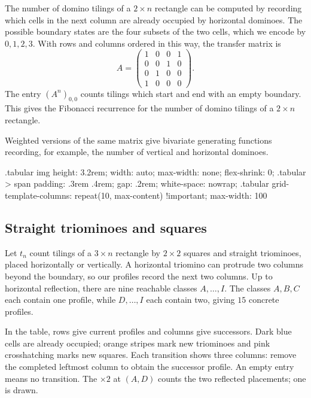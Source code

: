 The number of domino tilings of a $2\times n$ rectangle can be computed by
recording which cells in the next column are already occupied by horizontal
dominoes.  The possible boundary states are the four subsets of the two cells,
which we encode by $0,1,2,3$.  With rows and columns ordered in this way, the
transfer matrix is
\[
  A=
  \begin{pmatrix}
  1 & 0 & 0 & 1\\
  0 & 0 & 1 & 0\\
  0 & 1 & 0 & 0\\
  1 & 0 & 0 & 0
  \end{pmatrix}.
\]
The entry $(A^n)_{0,0}$ counts tilings which start and end with an empty
boundary.  This gives the Fibonacci recurrence for the number of domino
tilings of a $2\times n$ rectangle.

Weighted versions of the same matrix give bivariate generating functions
recording, for example, the number of vertical and horizontal dominoes.


\begin{cssvars}
.tabular img { height: 3.2rem; width: auto; max-width: none; flex-shrink: 0; }
.tabular > span { padding: .3rem .4rem; gap: .2rem; white-space: nowrap; }
.tabular {
  grid-template-columns: repeat(10, max-content) !important;
  max-width: 100%
}
\end{cssvars}

\subsection[transferMatrixTriominoTilings]{Straight triominoes and squares}

Let $t_n$ count tilings of a $3\times n$ rectangle by $2\times2$ squares
and straight triominoes, placed horizontally or vertically.
A horizontal triomino can protrude two columns beyond the boundary, so our
profiles record the next two columns. Up to horizontal reflection, there
are nine reachable classes $A,\dotsc,I$. The classes $A,B,C$ each contain
one profile, while $D,\dotsc,I$ each contain two, giving $15$ concrete profiles.

In the table, rows give current profiles and columns give successors.
Dark blue cells are already occupied; orange stripes mark new triominoes
and pink crosshatching marks new squares. Each transition shows three columns:
remove the completed leftmost column to obtain the successor profile.
An empty entry means no transition. The $\times2$ at $(A,D)$ counts the
two reflected placements; one is drawn.

